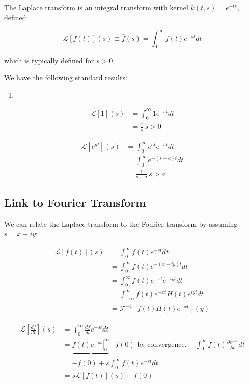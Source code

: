 \documentclass{physics_notes}
\newcommand{\intfty}{\int_{-\infty}^\infty}
\newcommand{\zintfty}{\int_0^\infty}
\renewcommand{\Finv}[2]{\mathcal{F}^{-1}\left[#1\right](#2)}
\renewcommand{\L}[2]{\mathcal{L}\left[#1\right](#2)}
\newcommand{\intL}[3]{\zintfty #1 e^{-#3#2}d#2}
\begin{document}
The Laplace transform is an integral transform with kernel $k(t,s) = e^{-ts}$, defined:

\begin{equation}
\L{f(t)}{s} \equiv \bar{f}(s) = \intL{f(t)}{t}{s}
\end{equation}

which is typically defined for $s>0$.

We have the following standard results:

\begin{enumerate}
	\item{}
\end{enumerate}

\begin{example}{}
\begin{align*}
\L{1}{s} &= \intL{1}{t}{s} \\
&= \frac{1}{s} \, s>0
\end{align*}
\end{example}

\begin{example}{}
\begin{align*}
\L{e^{at}}{s} &= \intL{e^{at}}{t}{s} \\
&= \zintfty e^{-(s-a)t} dt \\
&= \frac{1}{s-a} \, s>a
\end{align*}
\end{example}

\subsection{Link to Fourier Transform}

We can relate the Laplace transform to the Fourier transform by assuming $s=x+iy$:

\begin{align}
\L{f(t)}{s} &= \intL{f(t)}{t}{s} \nonumber \\
&= \zintfty f(t) e^{-(x+iy)t} dt \nonumber \\
&= \zintfty f(t) e^{-xt} e^{-iyt} dt \nonumber \\
&= \intfty f(t) e^{-xt} H(t)e^{iyt} dt \nonumber \\
&= \Finv{f(t)H(t)e^{-xt}}{y}
\end{align}

\begin{example}{}
\begin{align*}
\L{\frac{df}{dt}}{s} &= \intL{\frac{df}{dt}}{t}{s} \\
&= \underbrace{\left. f(t)e^{-st}\right|^\infty_0}{-f(0) \text{ by convergence.}} - \zintfty f(t)\frac{\partial e^{-st}}{\partial t} dt \\
&= -f(0) + s\zintfty f(t) e^{-st} dt \\
&= s\L{f(t)}{s} - f(0)
\end{align*}
\end{example}
\end{document}

